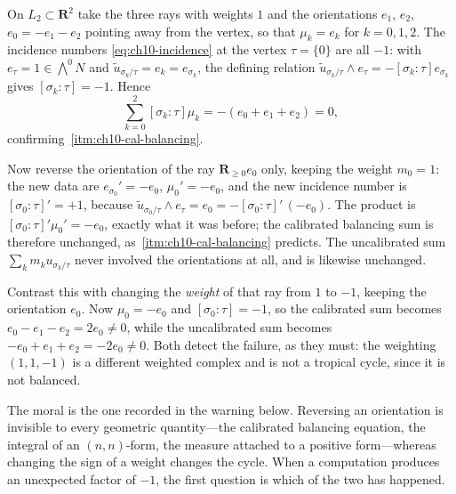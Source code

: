 \begin{example}
\label{ex:ch10-sign-test-line}
On $L_2\subset\mathbf R^2$ take the three rays with weights $1$ and the
orientations $e_1$, $e_2$, $e_0=-e_1-e_2$ pointing away from the vertex, so
that $\mu_k=e_k$ for $k=0,1,2$.  The incidence numbers
\eqref{eq:ch10-incidence} at the vertex $\tau=\{0\}$ are all $-1$: with
$e_\tau=1\in\bigwedge^0N$ and $\widetilde u_{\sigma_k/\tau}=e_k=e_{\sigma_k}$,
the defining relation
$\widetilde u_{\sigma_k/\tau}\wedge e_\tau=-[\sigma_k:\tau]e_{\sigma_k}$
gives $[\sigma_k:\tau]=-1$.  Hence
\[
 \sum_{k=0}^2[\sigma_k:\tau]\mu_k
 =-(e_0+e_1+e_2)=0,
\]
confirming \,\cref{itm:ch10-cal-balancing}.

Now reverse the orientation of the ray $\mathbf R_{\geq0}e_0$ only, keeping
the weight $m_0=1$: the new data are $e_{\sigma_0}'=-e_0$,
$\mu_0'=-e_0$, and the new incidence number is
$[\sigma_0:\tau]'=+1$, because
$\widetilde u_{\sigma_0/\tau}\wedge e_\tau=e_0
=-[\sigma_0:\tau]'\,(-e_0)$.  The product is
$[\sigma_0:\tau]'\mu_0'=-e_0$, exactly what it was before; the calibrated
balancing sum is therefore unchanged, as
\,\cref{itm:ch10-cal-balancing}
predicts.  The uncalibrated sum $\sum_km_ku_{\sigma_k/\tau}$ never involved
the orientations at all, and is likewise unchanged.

Contrast this with changing the \emph{weight} of that ray from $1$ to $-1$,
keeping the orientation $e_0$.  Now $\mu_0=-e_0$ and
$[\sigma_0:\tau]=-1$, so the calibrated sum becomes
$e_0-e_1-e_2=2e_0\neq0$, while the uncalibrated sum becomes
$-e_0+e_1+e_2=-2e_0\neq0$.  Both detect the failure, as they must: the
weighting $(1,1,-1)$ is a different weighted complex and is not a tropical
cycle, since it is not balanced.

The moral is the one recorded in the warning below.  Reversing an orientation
is invisible to every geometric quantity---the calibrated balancing equation,
the integral of an $(n,n)$-form, the measure attached to a positive
form---whereas changing the sign of a weight changes the cycle.  When a
computation produces an unexpected factor of $-1$, the first question is
which of the two has happened.
\end{example}

